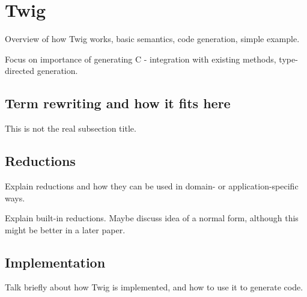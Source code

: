 \section{Twig}

Overview of how Twig works, basic semantics, code generation, simple example.

Focus on importance of generating C - integration with existing methods, type-directed generation.

\subsection{Term rewriting and how it fits here}

This is not the real subsection title.

\subsection{Reductions}

Explain reductions and how they can be used in domain- or application-specific
ways.

Explain built-in reductions. Maybe discuss idea of a normal form, although
this might be better in a later paper.

\subsection{Implementation}

Talk briefly about how Twig is implemented, and how to use it to generate
code.
